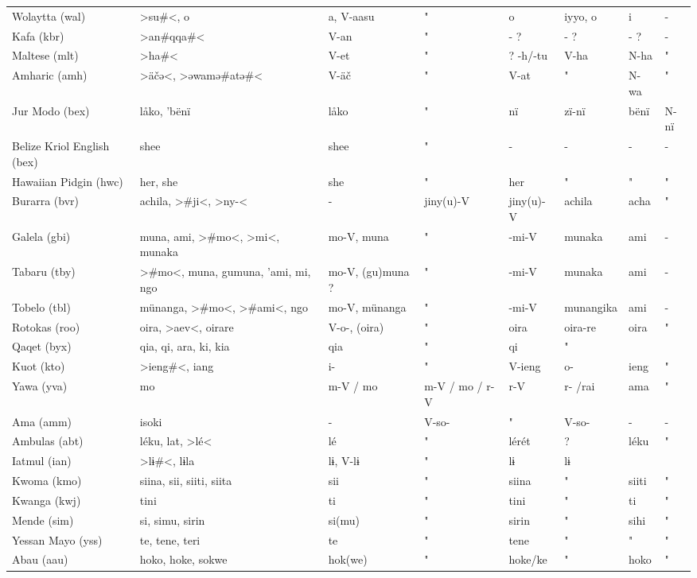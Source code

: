 \begin{landscape}
\begin{longtable}{*{8}{l}}
Wolaytta (wal)	&	>su\#<, o	&	a, V-aasu	&	"	&	o	&	iyyo, o	&	i	&	 -	\\
Kafa (kbr)	&	>an\#<, >qqa\#<	&	V-an	&	"	&	 - ?	&	 - ?	&	 - ?	&	 -	\\
Maltese (mlt)	&	>ha\#<	&	V-et	&	"	&	? -h/-tu	&	V-ha	&	N-ha	&	"	\\
Amharic (amh)	&	>äčə<, >əwamə\#<, >atə\#<	&	V-äč	&	"	&	V-at	&	"	&	N-wa	&	"	\\
Jur Modo (bex)	&	låko, 'bënï	&	låko 	&	"	&	nï 	&	zï-nï	&	bënï	&	 N-nï	\\
Belize Kriol English (bex)	&	shee	&	shee	&	"	&	 -	&	 -	&	 -	&	 -	\\
Hawaiian Pidgin (hwc)	&	her, she	&	she	&	"	&	her	&	"	&	"	&	"	\\
Burarra (bvr)	&	achila, >\#ji<, >ny-<	&	 -	&	jiny(u)-V	&	jiny(u)-V	&	achila	&	acha	&	"	\\
Galela (gbi)	&	muna, ami, >\#mo<, >mi<, munaka	&	mo-V, muna	&	"	&	 -mi-V	&	munaka	&	ami	&	 -	\\
Tabaru (tby)	&	>\#mo<, muna, gumuna, 'ami, mi, ngo	&	mo-V, (gu)muna ?	&	"	&	 -mi-V	&	munaka	&	ami	&	 -	\\
Tobelo (tbl)	&	münanga, >\#mo<, >\#ami<, ngo	&	mo-V, münanga	&	"	&	 -mi-V	&	munangika	&	ami	&	 -	\\
Rotokas (roo)	&	oira, >aev<, oirare	&	V-o-, (oira)	&	"	&	oira	&	oira-re	&	oira	&	"	\\
Qaqet (byx)	&	qia, qi, ara, ki, kia	&	qia	&	"	&	qi	&	"	&		&		\\
Kuot (kto)	&	>ieng\#<, iang	&	i-	&	"	&	V-ieng	&	o-	&	ieng	&	"	\\
Yawa (yva)	&	mo	&	m-V / mo	&	m-V / mo / r-V	&	r-V	&	r- /rai	&	ama	&	"	\\
Ama (amm)	&	isoki	&	 -	&	 V-so-	&	"	&	V-so-	&	 -	&	 -	\\
Ambulas (abt)	&	léku, lat, >lé<	&	lé	&	"	&	lérét	&	?	&	léku 	&	"	\\
Iatmul (ian)	&	>lɨ\#<, lɨla	&	 lɨ, V-lɨ	&	"	&	lɨ	&	lɨ	&		&		\\
Kwoma (kmo)	&	siina, sii, siiti, {siita}	&	sii	&	"	&	siina	&	"	&	siiti	&	"	\\
Kwanga (kwj)	&	tini	&	ti	&	"	&	tini	&	"	&	ti	&	"	\\
Mende (sim)	&	si, simu, sirin	&	si(mu)	&	"	&	sirin	&	"	&	sihi	&	"	\\
Yessan Mayo (yss)	&	te, tene, teri	&	te	&	"	&	tene	&	"	&	"	&	"	\\
Abau (aau)	&	hoko, hoke, sokwe	&	hok(we)	&	"	&	hoke/ke	&	"	&	hoko	&	"	\\

\end{longtable}
\end{landscape}

